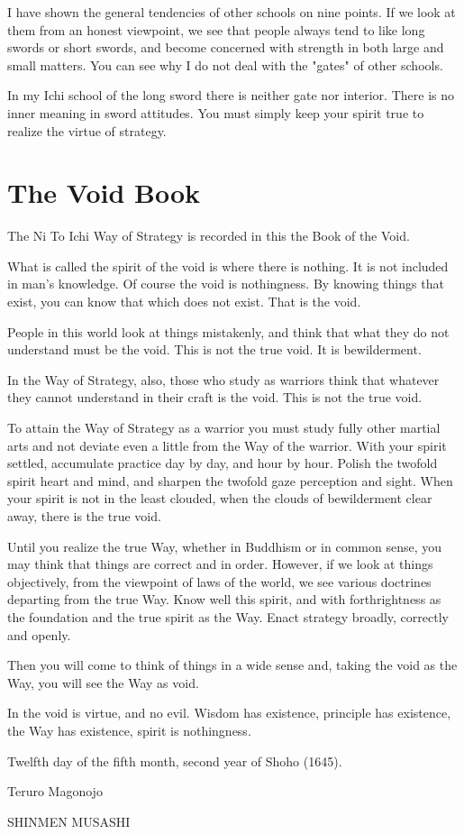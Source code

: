 \documentclass[12pt]{report}
\newcommand{\mychapter}[2]{
\setcounter{chapter}{#1}
    \setcounter{section}{0}
    \chapter*{#2}
    \addcontentsline{toc}{chapter}{#2}
}
\begin{document}
I have shown the general tendencies of other schools on nine points. If we look at them from an honest viewpoint, we see that people always tend to like long swords or short swords, and become concerned with strength in both large and small matters. You can see why I do not deal with the "gates" of other schools.

In my Ichi school of the long sword there is neither gate nor interior. There is no inner meaning in sword attitudes. You must simply keep your spirit true to realize the virtue of strategy.
\mychapter{6}{The Void Book}
The Ni To Ichi Way of Strategy is recorded in this the Book of the Void.

What is called the spirit of the void is where there is nothing. It is not included in man's knowledge. Of course the void is nothingness. By knowing things that exist, you can know that which does not exist. That is the void.

People in this world look at things mistakenly, and think that what they do not understand must be the void. This is not the true void. It is bewilderment.

In the Way of Strategy, also, those who study as warriors think that whatever they cannot understand in their craft is the void. This is not the true void.

To attain the Way of Strategy as a warrior you must study fully other martial arts and not deviate even a little from the Way of the warrior. With your spirit settled, accumulate practice day by day, and hour by hour. Polish the twofold spirit heart and mind, and sharpen the twofold gaze perception and sight. When your spirit is not in the least clouded, when the clouds of bewilderment clear away, there is the true void.

Until you realize the true Way, whether in Buddhism or in common sense, you may think that things are correct and in order. However, if we look at things objectively, from the viewpoint of laws of the world, we see various doctrines departing from the true Way. Know well this spirit, and with forthrightness as the foundation and the true spirit as the Way. Enact strategy broadly, correctly and openly.

Then you will come to think of things in a wide sense and, taking the void as the Way, you will see the Way as void.

In the void is virtue, and no evil. Wisdom has existence, principle has existence, the Way has existence, spirit is nothingness.

Twelfth day of the fifth month, second year of Shoho (1645).

Teruro Magonojo

SHINMEN MUSASHI
\end{document}
